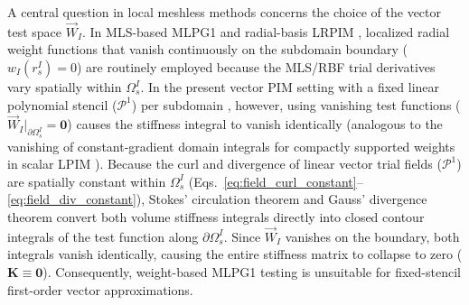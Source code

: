 \documentclass[preprint,12pt]{elsarticle}
\begin{document}
A central question in local meshless methods concerns the choice of the vector test space $\vec{W}_I$. In MLS-based MLPG1 \cite{atluri1998new, atluri2002meshless} and radial-basis LRPIM \cite{liu2005introduction}, localized radial weight functions that vanish continuously on the subdomain boundary ($w_I(r_s^I) = 0$) are routinely employed because the MLS/RBF trial derivatives vary spatially within $\Omega_s^I$. In the present vector PIM setting with a fixed linear polynomial stencil ($\mathcal{P}^1$) per subdomain \cite{liu2001local, stable_vnmm2d_2026}, however, using vanishing test functions ($\vec{W}_I|_{\partial\Omega_s^I} = \mathbf{0}$) causes the stiffness integral to vanish identically (analogous to the vanishing of constant-gradient domain integrals for compactly supported weights in scalar LPIM \cite{liu2001local}). Because the curl and divergence of linear vector trial fields ($\mathcal{P}^1$) are spatially constant within $\Omega_s^I$ (Eqs.~\eqref{eq:field_curl_constant}--\eqref{eq:field_div_constant}), Stokes' circulation theorem and Gauss' divergence theorem convert both volume stiffness integrals directly into closed contour integrals of the test function along $\partial\Omega_s^I$. Since $\vec{W}_I$ vanishes on the boundary, both integrals vanish identically, causing the entire stiffness matrix to collapse to zero ($\mathbf{K} \equiv \mathbf{0}$). Consequently, weight-based MLPG1 testing is unsuitable for fixed-stencil first-order vector approximations.
\end{document}
